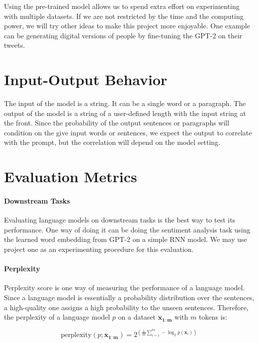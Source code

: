 \documentclass[10pt]{article}
\begin{document}
Using the pre-trained model allows us to spend extra effort on experimenting with multiple datasets. If we are not restricted by the time and the computing power, we will try other ideas to make this project more enjoyable. One example can be generating digital versions of people by fine-tuning the GPT-2 on their tweets.

\section{Input-Output Behavior}

The input of the model is a string. It can be a single word or a paragraph. The output of the model is a string of a user-defined length with the input string at the front. Since the probability of the output sentences or paragraphs will condition on the give input words or sentences, we expect the output to correlate with the prompt, but the correlation will depend on the model setting.

\section{Evaluation Metrics}

\paragraph{Downstream Tasks} Evaluating language models on downstream tasks is the best way to test its performance. One way of doing it can be doing the sentiment analysis task using the learned word embedding from GPT-2 on a simple RNN model. We may use project one as an experimenting procedure for this evaluation.

\paragraph{Perplexity} Perplexity score is one way of measuring the performance of a language model. Since a language model is essentially a probability distribution over the sentences, a high-quality one assigns a high probability to the unseen sentences. Therefore, the perplexity of a language model $p$ on a dataset $\bm{\overline{x}_{1:m}}$ with $m$ tokens \cite{smith_probabilistic_nodate} is:

\begin{equation}
   \text{perplexity}(p; \bm{\overline{x}_{1:m}}) = 2^{\displaystyle \left(\frac{1}{M} \sum_{i=1}^{m}-\log _{2} p\left(\overline{\boldsymbol{x}}_{i}\right)\right)}
\end{equation}
\end{document}
